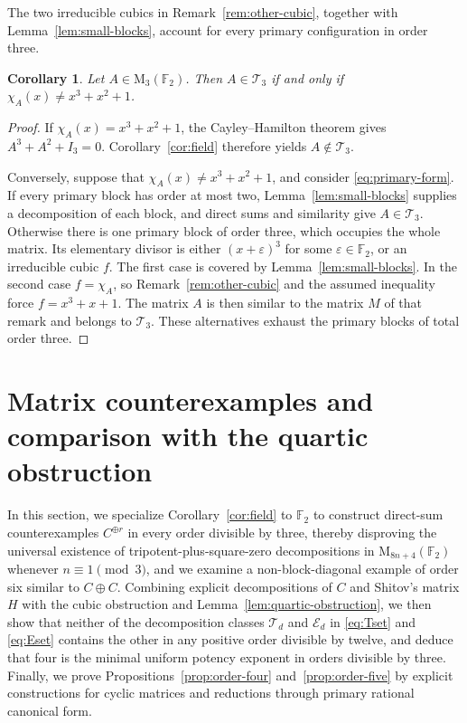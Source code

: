 \documentclass[12pt]{amsart}
\newtheorem{corollary}[theorem]{Corollary}
\theoremstyle{remark}
\numberwithin{equation}{section}
\theoremstyle{definition}
\newcommand{\F}{\mathbb F}
\newcommand{\Mat}{\mathrm M}
\newcommand{\Id}{I}
\newcommand{\TS}{\mathcal T}
\newcommand{\IC}{\mathcal E}
\begin{document}
The two irreducible cubics in Remark~\ref{rem:other-cubic}, together with Lemma~\ref{lem:small-blocks}, account for every primary configuration in order three.

\begin{corollary}\label{cor:order-three}
Let $A\in\Mat_3(\F_2)$. Then $A\in\TS_3$ if and only if $\chi_A(x)\neq x^3+x^2+1$.
\end{corollary}

\begin{proof}
If $\chi_A(x)=x^3+x^2+1$, the Cayley--Hamilton theorem gives $A^3+A^2+\Id_3=0$. Corollary~\ref{cor:field} therefore yields $A\notin\TS_3$.

Conversely, suppose that $\chi_A(x)\neq x^3+x^2+1$, and consider \eqref{eq:primary-form}. If every primary block has order at most two, Lemma~\ref{lem:small-blocks} supplies a decomposition of each block, and direct sums and similarity give $A\in\TS_3$. Otherwise there is one primary block of order three, which occupies the whole matrix. Its elementary divisor is either $(x+\varepsilon)^3$ for some $\varepsilon\in\F_2$, or an irreducible cubic $f$. The first case is covered by Lemma~\ref{lem:small-blocks}. In the second case $f=\chi_A$, so Remark~\ref{rem:other-cubic} and the assumed inequality force $f=x^3+x+1$. The matrix $A$ is then similar to the matrix $M$ of that remark and belongs to $\TS_3$. These alternatives exhaust the primary blocks of total order three.
\end{proof}

\section{Matrix counterexamples and comparison with the quartic obstruction}\label{sec:matrices}

In this section, we specialize Corollary~\ref{cor:field} to $\F_2$ to construct direct-sum counterexamples $C^{\oplus r}$ in every order divisible by three, thereby disproving the universal existence of tripotent-plus-square-zero decompositions in $\Mat_{8n+4}(\F_2)$ whenever $n\equiv1\pmod3$, and we examine a non-block-diagonal example of order six similar to $C\oplus C$. Combining explicit decompositions of $C$ and Shitov's matrix $H$ with the cubic obstruction and Lemma~\ref{lem:quartic-obstruction}, we then show that neither of the decomposition classes $\TS_d$ and $\IC_d$ in \eqref{eq:Tset} and \eqref{eq:Eset} contains the other in any positive order divisible by twelve, and deduce that four is the minimal uniform potency exponent in orders divisible by three. Finally, we prove Propositions~\ref{prop:order-four} and~\ref{prop:order-five} by explicit constructions for cyclic matrices and reductions through primary rational canonical form.
\end{document}
